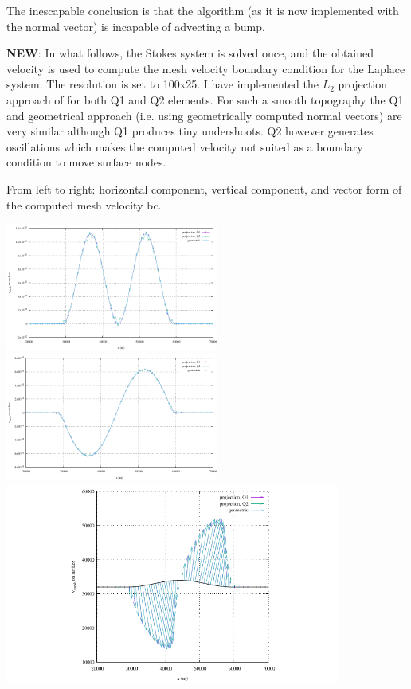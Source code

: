 The inescapable conclusion is that the algorithm (as it is now implemented with the normal 
vector) is incapable of advecting a bump. 

{\bf NEW}: In what follows, the Stokes system is solved once, and the obtained velocity
is used to compute the mesh velocity boundary condition for the Laplace system. 
The resolution is set to 100x25. I have implemented the $L_2$ projection approach 
of \cite{robh17} for both Q1 and Q2 elements. For such a smooth topography the 
Q1 and geometrical approach (i.e. using geometrically computed normal vectors) are
very similar although Q1 produces tiny undershoots. Q2 however generates oscillations
which makes the computed velocity not suited as a boundary condition to move surface nodes. 

From left to right: horizontal component, vertical component, and vector form 
of the computed mesh velocity bc.

\begin{center}
\includegraphics[width=7cm]{python_codes/fieldstone_54/images/exp7/100x25/umesh}
\includegraphics[width=7cm]{python_codes/fieldstone_54/images/exp7/100x25/vmesh}\\
\includegraphics[width=11cm]{python_codes/fieldstone_54/images/exp7/100x25/velmesh}
\end{center}

